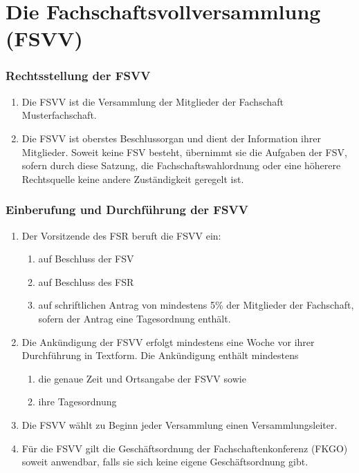 \documentclass{article}
\newcommand{\fachschaft}{Musterfachschaft}
\begin{document}
\part{Die Fachschaftsvollversammlung (FSVV)}
\section{Rechtsstellung der FSVV}
\begin{enumerate}[(1)]
    \item Die FSVV ist die Versammlung der Mitglieder der Fachschaft \fachschaft.
    \item Die FSVV ist oberstes Beschlussorgan und dient der Information ihrer Mitglieder. Soweit keine FSV besteht, übernimmt sie die Aufgaben der FSV, sofern durch diese Satzung, die Fachschaftswahlordnung oder eine höherere Rechtsquelle keine andere Zuständigkeit geregelt ist.
\end{enumerate}

\section{Einberufung und Durchführung der FSVV}
\begin{enumerate}[(1)]
	\item Der Vorsitzende des FSR beruft die FSVV ein:
	\begin{enumerate}[1.]
		\item auf Beschluss der FSV
		\item auf Beschluss des FSR
		\item auf schriftlichen Antrag von mindestens 5\% der Mitglieder der Fachschaft, sofern der Antrag eine Tagesordnung enthält.
	\end{enumerate}
	\item Die Ankündigung der FSVV erfolgt mindestens eine Woche vor ihrer Durchführung in Textform. Die Ankündigung enthält mindestens
	\begin{enumerate}[1.]
		\item die genaue Zeit und Ortsangabe der FSVV sowie
		\item ihre Tagesordnung
	\end{enumerate}
	\item Die FSVV wählt zu Beginn jeder Versammlung einen Versammlungsleiter.
	\item Für die FSVV gilt die Geschäftsordnung der Fachschaftenkonferenz (FKGO) soweit anwendbar, falls sie sich keine eigene Geschäftsordnung gibt.
\end{enumerate}
\end{document}
